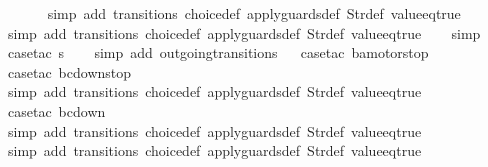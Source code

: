 \begin{isabellebody}
\ \ \ \ \ \isamarkupfalse%
\ {\isacharparenleft}simp\ add{\isacharcolon}\ transitions\ choice{\isacharunderscore}def\ apply{\isacharunderscore}guards{\isacharunderscore}def\ Str{\isacharunderscore}def\ value{\isacharunderscore}eq{\isacharunderscore}true{\isacharparenright}\isanewline
\ \ \ \ \isamarkupfalse%
\ {\isacharparenleft}simp\ add{\isacharcolon}\ transitions\ choice{\isacharunderscore}def\ apply{\isacharunderscore}guards{\isacharunderscore}def\ Str{\isacharunderscore}def\ value{\isacharunderscore}eq{\isacharunderscore}true{\isacharparenright}\isanewline
\ \ \isamarkupfalse%
\ simp\isanewline
\isanewline
\ \ \isamarkupfalse%
\ {\isacharparenleft}case{\isacharunderscore}tac\ {\isachardoublequoteopen}s{\isacharequal}{}{\isachardoublequoteclose}{\isacharparenright}\isanewline
\ \ \isamarkupfalse%
\ {\isacharparenleft}simp\ add{\isacharcolon}\ outgoing{\isacharunderscore}transitions{\isacharunderscore}{}{\isacharparenright}\isanewline
\ \isamarkupfalse%
\ {\isacharparenleft}case{\isacharunderscore}tac\ {\isachardoublequoteopen}ba{\isacharequal}motorstop{}{\isachardoublequoteclose}{\isacharparenright}\isanewline
\ \ \ \ \isamarkupfalse%
\ {\isacharparenleft}case{\isacharunderscore}tac\ {\isachardoublequoteopen}bc{\isacharequal}down{}{}stop{\isachardoublequoteclose}{\isacharparenright}\isanewline
\ \ \ \ \ \isamarkupfalse%
\ {\isacharparenleft}simp\ add{\isacharcolon}\ transitions\ choice{\isacharunderscore}def\ apply{\isacharunderscore}guards{\isacharunderscore}def\ Str{\isacharunderscore}def\ value{\isacharunderscore}eq{\isacharunderscore}true{\isacharparenright}\isanewline
\ \ \ \ \isamarkupfalse%
\ {\isacharparenleft}case{\isacharunderscore}tac\ {\isachardoublequoteopen}bc{\isacharequal}down{}{}{\isachardoublequoteclose}{\isacharparenright}\isanewline
\ \ \ \ \ \isamarkupfalse%
\ {\isacharparenleft}simp\ add{\isacharcolon}\ transitions\ choice{\isacharunderscore}def\ apply{\isacharunderscore}guards{\isacharunderscore}def\ Str{\isacharunderscore}def\ value{\isacharunderscore}eq{\isacharunderscore}true{\isacharparenright}\isanewline
\ \ \ \ \isamarkupfalse%
\ {\isacharparenleft}simp\ add{\isacharcolon}\ transitions\ choice{\isacharunderscore}def\ apply{\isacharunderscore}guards{\isacharunderscore}def\ Str{\isacharunderscore}def\ value{\isacharunderscore}eq{\isacharunderscore}true{\isacharparenright}\isanewline

\end{isabellebody}
